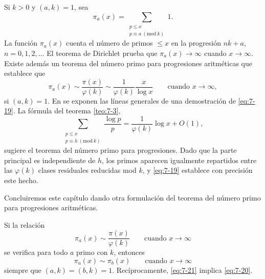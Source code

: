 \documentclass[12pt,a4paper]{book}
\begin{document}
    Si $k>0$ y $(a,k)=1$, sea
    \begin{equation*}
        \pi_{a}(x)=\sum_{\substack{p\leq x\\p\equiv a\ (\mathrm{mod}\ k)}}1.
    \end{equation*}
    La función $\pi_{a}(x)$ cuenta el número de primos $\leq x$ en la progresión $nk+a$,
    $n=0,1,2,\dots$ El teorema de Dirichlet prueba que $\pi_{a}(x)\to\infty$ cuando
    $x\to\infty$. Existe además un teorema del número primo para progresiones aritméticas
    que establece que
    \begin{equation}\label{eq:7-19}
        \pi_{a}(x)\sim\frac{\pi(x)}{\varphi(k)}\sim\frac{1}{\varphi(k)}\frac{x}{\log x}
        \qquad\text{cuando }x\to\infty,
    \end{equation}
    si $(a,k)=1$. En \cite{leveque1956} se exponen las líneas generales de una demostración de
    \eqref{eq:7-19}. La fórmula del teorema \ref{teo:7-3},
    \begin{equation*}
        \sum_{\substack{p\leq x\\p\equiv h\ (\mathrm{mod}\ k)}}\frac{\log p}{p}
        =\frac{1}{\varphi(k)}\log x+O(1),
    \end{equation*}
    sugiere el teorema del número primo para progresiones. Dado que la parte principal es
    independiente de $h$, los primos aparecen igualmente repartidos entre las $\varphi(k)$
    clases residuales reducidas mod $k$, y \eqref{eq:7-19} establece con precisión este
    hecho.

    Concluiremos este capítulo dando otra formulación del teorema del número primo para
    progresiones aritméticas.

    \begin{teorema}
        Si la relación
        \begin{equation}\label{eq:7-20}
            \pi_{a}(x)\sim\frac{\pi(x)}{\varphi(k)}\qquad\text{cuando }x\to\infty
        \end{equation}
        se verifica para todo $a$ primo con $k$, entonces
        \begin{equation}\label{eq:7-21}
            \pi_{a}(x)\sim\pi_{b}(x)\qquad\text{cuando }x\to\infty
        \end{equation}
        siempre que $(a,k)=(b,k)=1$. Recíprocamente, \eqref{eq:7-21} implica
        \eqref{eq:7-20}.
    \end{teorema}
\end{document}
